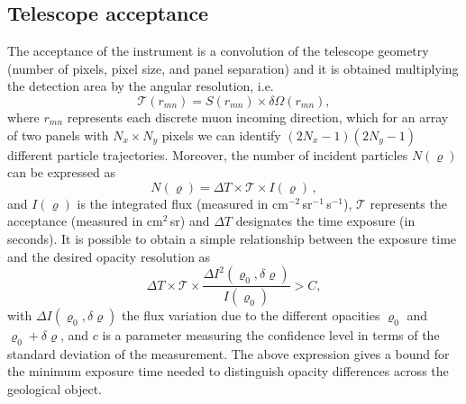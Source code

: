 \documentclass[letterpaper,10pt,titlepage,linenumber]{article}
\begin{document}
\subsection{Telescope acceptance}
\label{subsec:acceptance}
The acceptance of the instrument is a convolution of the telescope geometry (number of pixels, pixel size, and panel separation) and it is obtained multiplying the detection area by the angular resolution, i.e.
\begin{equation}
\mathcal{T}(r_{mn})=S(r_{mn})\times \delta\Omega(r_{mn}),
\end{equation}  
where $r_{mn}$ represents each discrete muon incoming direction, which for an array of two panels with $N_x\times N_y$ pixels  we can identify $(2N_x-1)(2N_y-1)$ different particle trajectories\cite{LesparreEtal2010}.  Moreover, the number of incident particles $N(\varrho)$ can be expressed as
 \begin{equation}
N(\varrho)=\Delta T \times \mathcal{T}\times I(\varrho)\, , \label{Nmuons}
\end{equation}
and $I(\varrho)$ is the integrated flux (measured in cm$^{-2}$\,sr$^{-1}$\,s$^{-1}$), $\mathcal{T}$ represents the acceptance (measured in cm$^{2}$\,sr) and $\Delta T$ designates the time exposure (in seconds). It is possible to obtain a simple relationship between the exposure time and the desired opacity resolution as
\begin{equation}
\Delta T\times \mathcal{T}\times \frac{\Delta I^2(\varrho_0,\delta\varrho)}{I(\varrho_0)}> C, \label{feasibility}
\end{equation}
with $\Delta I(\varrho_0,\delta\varrho)$ the flux variation due to the different opacities $\varrho_0$ and $\varrho_0+\delta\varrho$, and $c$ is a parameter measuring the confidence level in terms of the standard deviation of the measurement. The above expression gives a bound for the minimum exposure time needed to distinguish opacity differences across the geological object\cite{LesparreEtal2010}.
\end{document}
